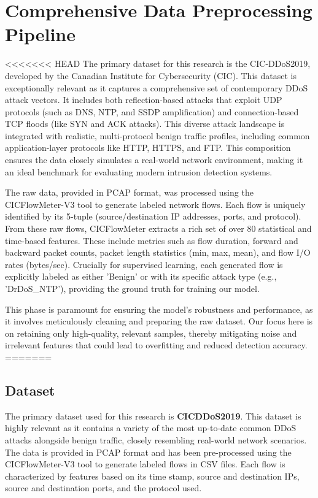 \documentclass{report}
\begin{document}
\section{Comprehensive Data Preprocessing Pipeline}

<<<<<<< HEAD
The primary dataset for this research is the CIC-DDoS2019, developed by the Canadian Institute for Cybersecurity (CIC). This dataset is exceptionally relevant as it captures a comprehensive set of contemporary DDoS attack vectors. It includes both reflection-based attacks that exploit UDP protocols (such as DNS, NTP, and SSDP amplification) and connection-based TCP floods (like SYN and ACK attacks). This diverse attack landscape is integrated with realistic, multi-protocol benign traffic profiles, including common application-layer protocols like HTTP, HTTPS, and FTP. This composition ensures the data closely simulates a real-world network environment, making it an ideal benchmark for evaluating modern intrusion detection systems.

The raw data, provided in PCAP format, was processed using the CICFlowMeter-V3 tool to generate labeled network flows. Each flow is uniquely identified by its 5-tuple (source/destination IP addresses, ports, and protocol). From these raw flows, CICFlowMeter extracts a rich set of over 80 statistical and time-based features. These include metrics such as flow duration, forward and backward packet counts, packet length statistics (min, max, mean), and flow I/O rates (bytes/sec). Crucially for supervised learning, each generated flow is explicitly labeled as either 'Benign' or with its specific attack type (e.g., 'DrDoS\_NTP'), providing the ground truth for training our model.

This phase is paramount for ensuring the model's robustness and performance, as it involves meticulously cleaning and preparing the raw dataset. Our focus here is on retaining only high-quality, relevant samples, thereby mitigating noise and irrelevant features that could lead to overfitting and reduced detection accuracy. 
=======
\subsection{Dataset}
The primary dataset used for this research is \textbf{CICDDoS2019}. This dataset is highly relevant as it contains a variety of the most up-to-date common DDoS attacks alongside benign traffic, closely resembling real-world network scenarios. The data is provided in PCAP format and has been pre-processed using the CICFlowMeter-V3 tool to generate labeled flows in CSV files. Each flow is characterized by features based on its time stamp, source and destination IPs, source and destination ports, and the protocol used.
\end{document}
